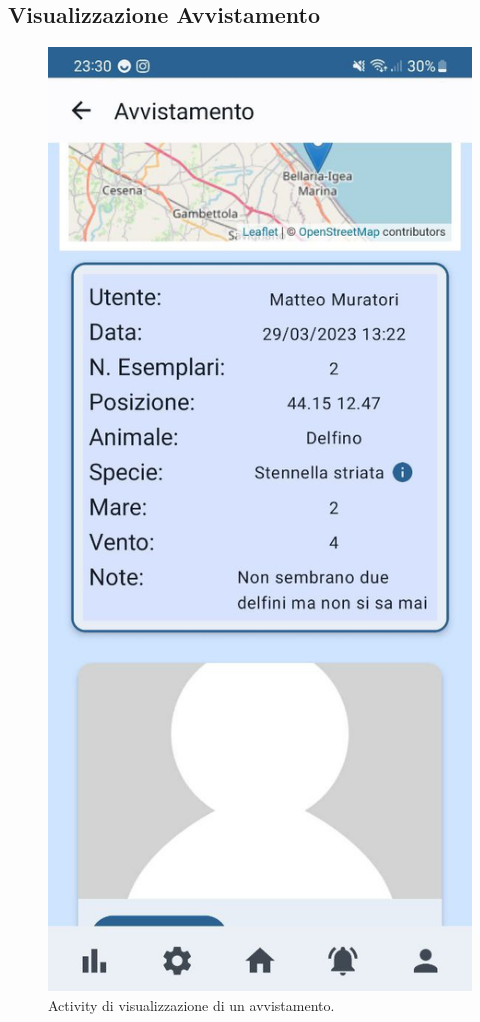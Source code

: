 \documentclass[a4paper,final,12pt]{report}
\begin{document}
\subsection{Visualizzazione Avvistamento}
\begin{figure}[hbtp]
\centering
\includegraphics[scale=0.20]{img_concettuale/vimob.jpg}
\caption{Activity di visualizzazione di un avvistamento.}
\end{figure}
\end{document}
